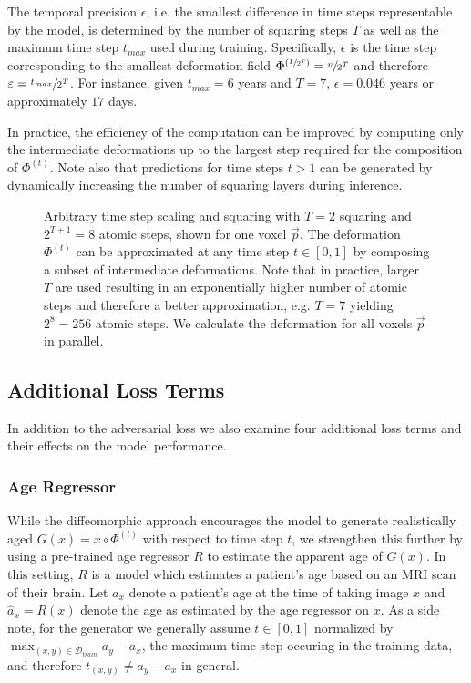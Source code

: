 The temporal precision $\epsilon$, i.e. the smallest difference in time steps representable by the model, is determined by the number of squaring steps $T$ as well as the maximum time step $t_{max}$ used during training. Specifically, $\epsilon$ is the time step corresponding to the smallest deformation field $\Phi^{(\sfrac{1}{2^T})} = \sfrac{v}{2^T}$ and therefore $\varepsilon = \sfrac{t_{max}}{2^T}$. For instance, given $t_{max} = 6$ years and $T = 7$, $\epsilon = 0.046$ years or approximately $17$ days.

In practice, the efficiency of the computation can be improved by computing only the intermediate deformations up to the largest step required for the composition of $\Phi^{(t)}$. Note also that predictions for time steps $t > 1$ can be generated by dynamically increasing the number of squaring layers during inference.



\begin{figure}
	\centering
	
	\caption{Arbitrary time step scaling and squaring with $T = 2$ squaring and $ 2^{T+1} = 8 $ atomic steps, shown for one voxel $ \vec p $. The deformation $ \Phi^{(t)} $ can be approximated at any time step $ t \in [0, 1] $ by composing a subset of intermediate deformations. Note that in practice, larger $T$ are used resulting in an exponentially higher number of atomic steps and therefore a better approximation, e.g. $T = 7$ yielding $ 2^8 = 256 $ atomic steps. We calculate the deformation for all voxels $ \vec{p} $ in parallel.} \label{fig:arbtimestep}
\end{figure}

\subsection{Additional Loss Terms}
In addition to the adversarial loss we also examine four additional loss terms and their effects on the model performance.

\subsubsection*{Age Regressor}
\label{sec:adaagereg}
While the diffeomorphic approach encourages the model to generate realistically aged $G(x) = x \circ \Phi^{(t)}$ with respect to time step $t$, we strengthen this further by using a pre-trained age regressor $R$ to estimate the apparent age of $G(x)$. In this setting, $R$ is a model which estimates a patient's age based on an MRI scan of their brain.
Let $ a_x $ denote a patient's age at the time of taking image $x$ and $ \hat a_x = R(x)$ denote the age as estimated by the age regressor on $x$. As a side note, for the generator we generally assume $t \in [0, 1]$ normalized by $\max_{(x, y) \in \mathcal{D}_{train}} a_y - a_x $, the maximum time step occuring in the training data, and therefore $t_{(x, y)} \neq a_y - a_x$ in general.

